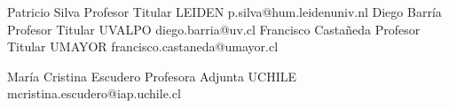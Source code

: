 





\begin{referees}
		{Patricio Silva}
		{Profesor Titular}
		{LEIDEN}
		{p.silva@hum.leidenuniv.nl}
		{Diego Barría}
		{Profesor Titular}
		{UVALPO}
		{diego.barria@uv.cl}
		{Francisco Castañeda}
		{Profesor Titular}
		{UMAYOR}
		{francisco.castaneda@umayor.cl}
\end{referees}

\begin{referees}
		{María Cristina Escudero}
		{Profesora Adjunta}
		{UCHILE}
		{mcristina.escudero@iap.uchile.cl}
\end{referees}